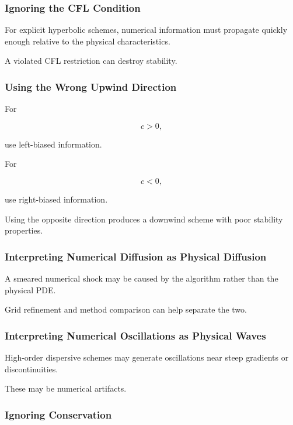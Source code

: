 \subsubsection{Ignoring the CFL Condition}

For explicit hyperbolic schemes, numerical information must propagate
quickly enough relative to the physical characteristics.

A violated CFL restriction can destroy stability.

\subsubsection{Using the Wrong Upwind Direction}

For

\[
c>0,
\]

use left-biased information.

For

\[
c<0,
\]

use right-biased information.

Using the opposite direction produces a downwind scheme with poor
stability properties.

\subsubsection{Interpreting Numerical Diffusion as Physical Diffusion}

A smeared numerical shock may be caused by the algorithm rather than the
physical PDE.

Grid refinement and method comparison can help separate the two.

\subsubsection{Interpreting Numerical Oscillations as Physical Waves}

High-order dispersive schemes may generate oscillations near steep
gradients or discontinuities.

These may be numerical artifacts.

\subsubsection{Ignoring Conservation}

